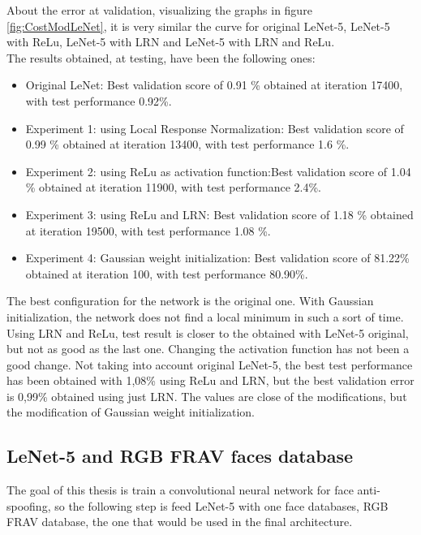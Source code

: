 About the error at validation, visualizing the graphs in figure \ref{fig:CostModLeNet}, it is very similar the curve for original LeNet-5, LeNet-5 with ReLu, LeNet-5 with LRN and LeNet-5 with LRN and ReLu.\\

The results obtained, at testing, have been the following ones:

\begin{itemize}
\item{Original LeNet}: Best validation score of 0.91 \% obtained at iteration 17400, with test performance 0.92\%.
\item{Experiment 1: using Local Response Normalization}: Best validation score of 0.99 \% obtained at iteration 13400, with test performance 1.6 \%.
\item{Experiment 2: using ReLu as activation function}:Best validation score of 1.04 \% obtained at iteration 11900, with test performance 2.4\%.
\item{Experiment 3: using ReLu and LRN}: Best validation score of 1.18 \% obtained at iteration 19500, with test performance 1.08 \%.
\item{Experiment 4: Gaussian weight initialization}: Best validation score of 81.22\% obtained at iteration 100, with test performance 80.90\%.
\end{itemize}

The best configuration for the network is the original one. With Gaussian initialization, the network does not find a local minimum in such a sort of time. Using LRN and ReLu, test result is closer to the obtained with LeNet-5 original, but not as good as the last one. Changing the activation function has not been a good change. Not taking into account original LeNet-5, the best test performance has been obtained with 1,08\% using ReLu and LRN, but the best validation error is 0,99\% obtained using just LRN. The values are close of the modifications, but the modification of Gaussian weight initialization.\\

\subsection{LeNet-5 and RGB FRAV faces database}
The goal of this thesis is train a convolutional neural network for face anti-spoofing, so the following step is feed LeNet-5 with one face databases, RGB FRAV database, the one that would be used in the final architecture.\\

